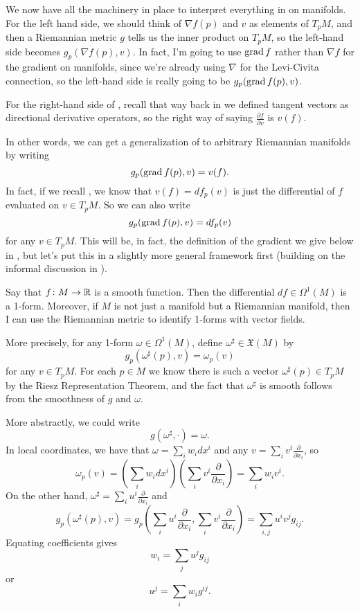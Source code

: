 We now have all the machinery in place to interpret everything in  on manifolds. For the left hand side, we should think of $\nabla f(p)$ and $v$ as elements of $T_pM$, and then a Riemannian metric $g$ tells us the inner product on $T_pM$, so the left-hand side becomes $g_p(\nabla f(p), v)$. In fact, I'm going to use $\operatorname{grad} f$ rather than $\nabla f$ for the gradient on manifolds, since we're already using $\nabla$ for the Levi-Civita connection, so the left-hand side is really going to be $g_p(\operatorname{grad} f(p), v)$. 

For the right-hand side of , recall that way back in  we defined tangent vectors as directional derivative operators, so the right way of saying $\frac{\partial f}{\partial v}$ is $v(f)$.

In other words, we can get a generalization of  to arbitrary Riemannian manifolds by writing
\begin{equation}\label{eq:grad1}
	g_p(\operatorname{grad} f(p), v) = v(f).
\end{equation}
In fact, if we recall , we know that $v(f) = df_p(v)$ is just the differential of $f$ evaluated on $v \in T_p M$. So we can also write
\begin{equation}\label{eq:grad2}
	g_p(\operatorname{grad} f(p), v) = df_p(v)
\end{equation}
for any $v \in T_pM$. This will be, in fact, the definition of the gradient we give below in , but let's put this in a slightly more general framework first (building on the informal discussion in ).

Say that $f \colon\thinspace\! M \to \mathbb{R}$ is a smooth function. Then the differential $df \in \Omega^1(M)$ is a 1-form. Moreover, if $M$ is not just a manifold but a Riemannian manifold, then I can use the Riemannian metric to identify 1-forms with vector fields. 

More precisely, for any 1-form $\omega \in \Omega^1(M)$, define $\omega^\sharp \in \mathfrak{X}(M)$ by
\[
	g_p(\omega^\sharp(p),v) = \omega_p(v)
\]
for any $v \in T_pM$. For each $p \in M$ we know there is such a vector $\omega^\sharp(p) \in T_pM$ by the Riesz Representation Theorem, and the fact that $\omega^\sharp$ is smooth follows from the smoothness of $g$ and $\omega$. 

More abstractly, we could write
\[
	g(\omega^\sharp,\cdot) = \omega.
\]
In local coordinates, we have that $\omega = \sum_i w_i dx^i$ and any $v = \sum_i v^i \frac{\partial}{\partial x_i}$, so
\[
	\omega_p(v) = \left( \sum_i w_i dx^i\right) \left( \sum_i v^i \frac{\partial}{\partial x_i} \right) = \sum_i w_iv^i.
\]
On the other hand, $\omega^\sharp = \sum_i u^i \frac{\partial}{\partial x_i}$ and
\[
	g_p(\omega^\sharp(p),v) = g_p\left(\sum_i u^i \frac{\partial}{\partial x_i}, \sum_i v^i \frac{\partial}{\partial x_i} \right) = \sum_{i,j} u^i v^j g_{ij}.
\]
Equating coefficients gives
\[
	w_i = \sum_j u^j g_{ij}
\]
or
\[
	u^j = \sum_i w_i g^{ij}.
\]

